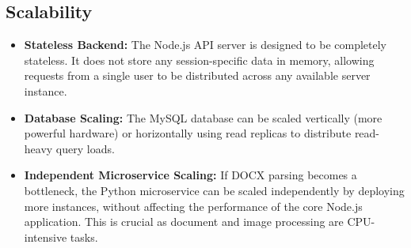 \FloatBarrier
\subsection{Scalability}
\begin{itemize}
    \item \textbf{Stateless Backend:} The Node.js API server is designed to be completely stateless. It does not store any session-specific data in memory, allowing requests from a single user to be distributed across any available server instance.
    \item \textbf{Database Scaling:} The MySQL database can be scaled vertically (more powerful hardware) or horizontally using read replicas to distribute read-heavy query loads.
    \item \textbf{Independent Microservice Scaling:} If DOCX parsing becomes a bottleneck, the Python microservice can be scaled independently by deploying more instances, without affecting the performance of the core Node.js application. This is crucial as document and image processing are CPU-intensive tasks.
\end{itemize}